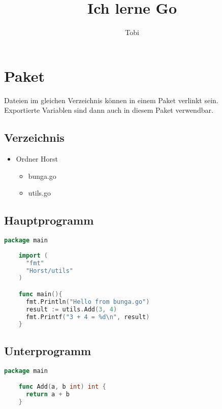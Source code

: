 \documentclass[twoside,a4paper,12pt]{article}
\title{Ich lerne Go}
\author{Tobi}
\begin{document}
\maketitle
\thispagestyle{empty} %
\newpage

\tableofcontents
\newpage

\section{Paket}
Dateien im gleichen Verzeichnis können in einem Paket verlinkt sein. \\
Exportierte Variablen sind dann auch in diesem Paket verwendbar.
\subsection{Verzeichnis}
\begin{itemize}
  \item Ordner Horst
  \begin{itemize}
    \item bunga.go
    \item utils.go
  \end{itemize}
\end{itemize}
\subsection{Hauptprogramm}
\begin{center}
  \begin{minipage}{1.0\textwidth}
    \begin{lstlisting}[language=Go]
    package main
    
    import (
      "fmt"
      "Horst/utils"
    )

    func main(){
      fmt.Println("Hello from bunga.go")
      result := utils.Add(3, 4)
      fmt.Printf("3 + 4 = %d\n", result)
    }
    \end{lstlisting}
  \end{minipage}
\end{center}  
\subsection{Unterprogramm}
\begin{center}
  \begin{minipage}{1.0\textwidth}
    \begin{lstlisting}[language=Go]
    package main

    func Add(a, b int) int {
      return a + b
    }
    \end{lstlisting}
  \end{minipage}
\end{center}
\end{document}
